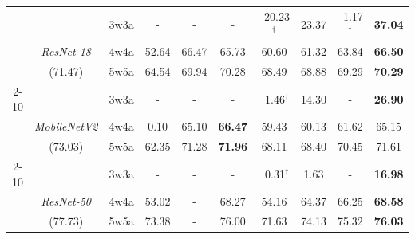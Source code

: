 \begin{table}
\begin{tabular}{c|cc|c|  c| c| ccc  |c}
\bottomrule
\toprule
\multirow{3}{*}{\textbf{}}
&                       &3w3a    &-      &- &-  &\ 20.23$^{\dag}$   &23.37       &\ 1.17$^{\dag}$    &\textbf{37.04}   \\
&\emph{ResNet-18}      &\cellcolor{mygreen}4w4a    &\cellcolor{mygreen}52.64 &\cellcolor{mygreen}66.47 &\cellcolor{mygreen}65.73     &\cellcolor{mygreen}60.60   &\cellcolor{mygreen}61.32       &\cellcolor{mygreen}63.84    &\cellcolor{mygreen}\textbf{66.50}  \\
&(71.47)            &5w5a    &64.54 &69.94  &70.28    &68.49   &68.88       &69.29    &\textbf{70.29}   \\

\cline{2-10}
\multirow{3}{*}{\textbf{ImageNet}}
&                       &3w3a    &-     &- &- &\ 1.46$^{\dag}$     &14.30    &-            &\textbf{26.90}   \\
&\emph{MobileNetV2}  &\cellcolor{mygreen}4w4a    &\cellcolor{mygreen}0.10  &\cellcolor{mygreen}65.10 &\cellcolor{mygreen}\textbf{66.47}   &\cellcolor{mygreen}59.43    &\cellcolor{mygreen}60.13    &\cellcolor{mygreen}61.62    &\cellcolor{mygreen}65.15  \\
&(73.03)           &5w5a    &62.35 &71.28 &\textbf{71.96}    &68.11   &68.40   &70.45    &{71.61}   \\

\cline{2-10}
\multirow{3}{*}{\textbf{}}
&                       &3w3a      &-    &-  &- &\ 0.31$^{\dag}$      &1.63    &-            &\textbf{16.98}   \\
&\emph{ResNet-50}      &\cellcolor{mygreen}4w4a      &\cellcolor{mygreen}53.02  &\cellcolor{mygreen}-  &\cellcolor{mygreen}68.27 &\cellcolor{mygreen}54.16    &\cellcolor{mygreen}64.37   &\cellcolor{mygreen}66.25    &\cellcolor{mygreen}\textbf{68.58}  \\
&(77.73)            &5w5a      &73.38  &-  &76.00  &71.63    &74.13   &75.32    &\textbf{76.03}   \\
\bottomrule
\end{tabular}
\vspace{-0.8em}
\end{table}









